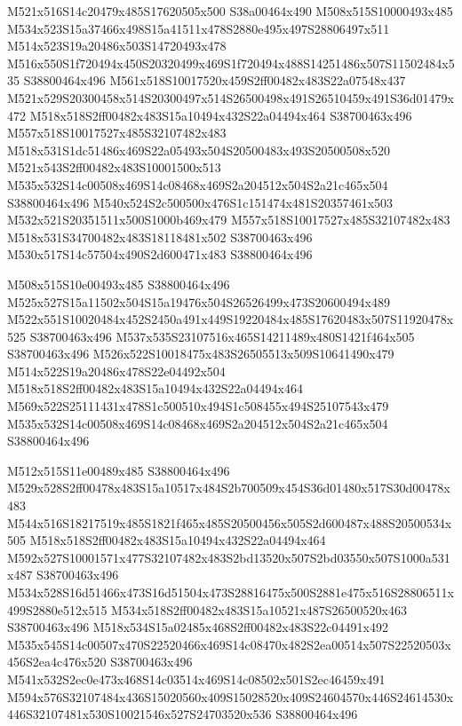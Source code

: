 \documentclass{article}
\begin{document}
\begin{multicols}{2}
M521x516S14c20479x485S17620505x500 S38a00464x490 M508x515S10000493x485 M534x523S15a37466x498S15a41511x478S2880e495x497S28806497x511 M514x523S19a20486x503S14720493x478 M516x550S1f720494x450S20320499x469S1f720494x488S14251486x507S11502484x535 S38800464x496 M561x518S10017520x459S2ff00482x483S22a07548x437 M521x529S20300458x514S20300497x514S26500498x491S26510459x491S36d01479x472 M518x518S2ff00482x483S15a10494x432S22a04494x464 S38700463x496 M557x518S10017527x485S32107482x483 M518x531S1dc51486x469S22a05493x504S20500483x493S20500508x520 M521x543S2ff00482x483S10001500x513 M535x532S14c00508x469S14c08468x469S2a204512x504S2a21c465x504 S38800464x496 M540x524S2c500500x476S1c151474x481S20357461x503 M532x521S20351511x500S1000b469x479 M557x518S10017527x485S32107482x483 M518x531S34700482x483S18118481x502 S38700463x496 M530x517S14c57504x490S2d600471x483 S38800464x496

M508x515S10e00493x485 S38800464x496 M525x527S15a11502x504S15a19476x504S26526499x473S20600494x489 M522x551S10020484x452S2450a491x449S19220484x485S17620483x507S11920478x525 S38700463x496 M537x535S23107516x465S14211489x480S1421f464x505 S38700463x496 M526x522S10018475x483S26505513x509S10641490x479 M514x522S19a20486x478S22e04492x504 M518x518S2ff00482x483S15a10494x432S22a04494x464 M569x522S25111431x478S1c500510x494S1c508455x494S25107543x479 M535x532S14c00508x469S14c08468x469S2a204512x504S2a21c465x504 S38800464x496

M512x515S11e00489x485 S38800464x496 M529x528S2ff00478x483S15a10517x484S2b700509x454S36d01480x517S30d00478x483 M544x516S18217519x485S1821f465x485S20500456x505S2d600487x488S20500534x505 M518x518S2ff00482x483S15a10494x432S22a04494x464 M592x527S10001571x477S32107482x483S2bd13520x507S2bd03550x507S1000a531x487 S38700463x496 M534x528S16d51466x473S16d51504x473S28816475x500S2881e475x516S28806511x499S2880e512x515 M534x518S2ff00482x483S15a10521x487S26500520x463 S38700463x496 M518x534S15a02485x468S2ff00482x483S22c04491x492 M535x545S14c00507x470S22520466x469S14c08470x482S2ea00514x507S22520503x456S2ea4c476x520 S38700463x496 M541x532S2ec0e473x468S14c03514x469S14c08502x501S2ec46459x491 M594x576S32107484x436S15020560x409S15028520x409S24604570x446S24614530x446S32107481x530S10021546x527S24703520x536 S38800464x496


\end{multicols}
\end{document}
